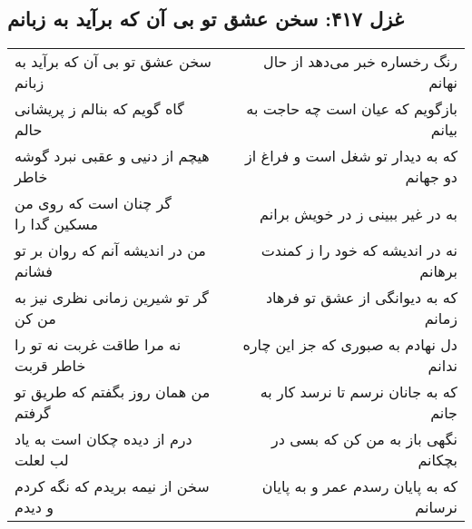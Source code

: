 \begin{center}
\section*{غزل ۴۱۷: سخن عشق تو بی آن که برآید به زبانم}
\label{sec:417}
\begin{longtable}{l p{0.5cm} r}
سخن عشق تو بی آن که برآید به زبانم
&&
رنگ رخساره خبر می‌دهد از حال نهانم
\\
گاه گویم که بنالم ز پریشانی حالم
&&
بازگویم که عیان است چه حاجت به بیانم
\\
هیچم از دنیی و عقبی نبرد گوشه خاطر
&&
که به دیدار تو شغل است و فراغ از دو جهانم
\\
گر چنان است که روی من مسکین گدا را
&&
به در غیر ببینی ز در خویش برانم
\\
من در اندیشه آنم که روان بر تو فشانم
&&
نه در اندیشه که خود را ز کمندت برهانم
\\
گر تو شیرین زمانی نظری نیز به من کن
&&
که به دیوانگی از عشق تو فرهاد زمانم
\\
نه مرا طاقت غربت نه تو را خاطر قربت
&&
دل نهادم به صبوری که جز این چاره ندانم
\\
من همان روز بگفتم که طریق تو گرفتم
&&
که به جانان نرسم تا نرسد کار به جانم
\\
درم از دیده چکان است به یاد لب لعلت
&&
نگهی باز به من کن که بسی در بچکانم
\\
سخن از نیمه بریدم که نگه کردم و دیدم
&&
که به پایان رسدم عمر و به پایان نرسانم
\\
\end{longtable}
\end{center}

